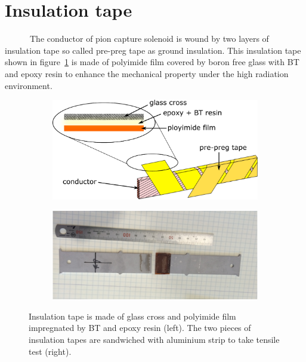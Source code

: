  \section{Insulation tape}
~~~~~~The conductor of pion capture solenoid is wound by two layers of insulation tape so called pre-preg tape as ground insulation.
This insulation tape shown in figure~\ref{3stur} is made of polyimide film covered by boron free glass with BT and epoxy resin to enhance the mechanical property under the high radiation environment.
 \begin{figure}[H]
  \begin{subfigure}{0.3\textwidth}
  \centering
  \includegraphics[scale=0.36]{chapter4/fig/prepreg.pdf}
  \label{3stur}
  \end{subfigure}
  \hspace{0.2\textwidth}
  \begin{subfigure}{0.3\textwidth}
  \centering
  \includegraphics[scale=0.31]{chapter4/fig/BUGT.pdf}
  \label{3break}
  \end{subfigure}
  \caption{Insulation tape is made of glass cross and polyimide film impregnated by BT and epoxy resin (left). The two pieces of insulation tapes are sandwiched with aluminium strip to take tensile test (right).}
 \end{figure}

